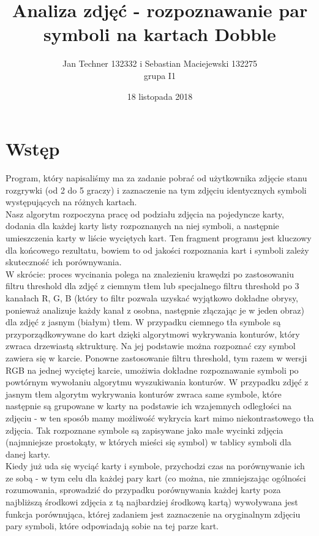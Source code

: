 \documentclass[10pt,a4paper]{article}
\author{Jan Techner 132332 i Sebastian Maciejewski 132275 \\ grupa I1}
\title{Analiza zdjęć - rozpoznawanie par symboli na kartach Dobble}
\date{18 listopada 2018}
\newcommand{\forceindent}{\leavevmode{\parindent=3em\indent}}
\begin{document}
\maketitle
\section{Wstęp}

\forceindent Program, który napisaliśmy ma za zadanie pobrać od użytkownika zdjęcie stanu rozgrywki (od 2 do 5 graczy) i zaznaczenie na tym zdjęciu identycznych symboli występujących na różnych kartach. \\
Nasz algorytm rozpoczyna pracę od podziału zdjęcia na pojedyncze karty, dodania dla każdej karty listy rozpoznanych na niej symboli, a następnie umieszczenia karty w 
liście wyciętych kart. Ten fragment programu jest kluczowy dla końcowego rezultatu, bowiem to od jakości rozpoznania kart i symboli zależy skuteczność ich porównywania. \\

W skrócie: proces wycinania polega na znalezieniu krawędzi po zastosowaniu filtru threshold dla zdjęć z ciemnym tłem lub specjalnego filtru threshold po 3 kanałach R, G, B (który to filtr pozwala uzyskać wyjątkowo dokładne obrysy, ponieważ analizuje każdy kanał z osobna, następnie złączając je w jeden obraz) dla zdjęć z jasnym (białym) tłem. W przypadku ciemnego tła symbole są przyporządkowywane do kart dzięki algorytmowi wykrywania konturów, który zwraca drzewiastą sktrukturę. Na jej podstawie można rozpoznać czy symbol zawiera się w karcie. Ponowne zastosowanie filtru threshold, tym razem w wersji RGB na jednej wyciętej karcie, umożiwia dokładne rozpoznawanie symboli po powtórnym wywołaniu algorytmu wyszukiwania konturów. W przypadku zdjęć z jasnym tłem algorytm wykrywania konturów zwraca same symbole, które następnie są grupowane w karty na podstawie ich wzajemnych odległości na zdjęciu - w ten sposób mamy możliwość wykrycia kart mimo niekontrastowego tła zdjęcia. Tak rozpoznane symbole są zapisywane jako małe wycinki zdjęcia (najmniejsze prostokąty, w których mieści się symbol) w tablicy symboli dla danej karty. \\

Kiedy już uda się wyciąć karty i symbole, przychodzi czas na porównywanie ich ze sobą - w tym celu dla każdej pary kart (co można, nie zmniejszając ogólności rozumowania, sprowadzić do przypadku porównywania każdej karty poza najbliższą środkowi zdjęcia z tą najbardziej środkową kartą) wywoływana jest funkcja porównująca, której zadaniem jest zaznaczenie na oryginalnym zdjęciu pary symboli, które odpowiadają sobie na tej parze kart. 
\end{document}
